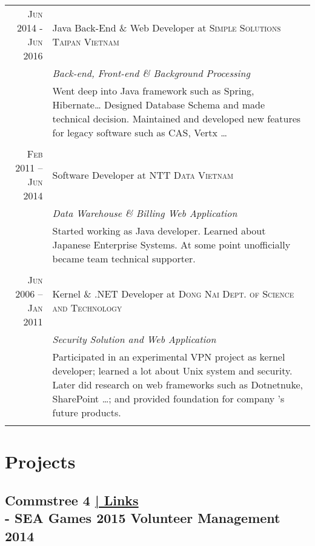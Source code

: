 \documentclass[a4paper,10pt]{article}
\begin{document}
\begin{tabular}{r|p{11cm}}

  \textsc{Jun 2014 - Jun 2016} & Java Back-End \& Web Developer at \textsc{Simple Solutions Taipan Vietnam} \\
  &\emph{Back-end, Front-end \& Background Processing}\\
  &\footnotesize{
    Went deep into Java framework such as Spring, Hibernate\ldots
    Designed Database Schema and made technical decision.
    Maintained and developed new features for legacy software such as CAS, Vertx \ldots}\\
  \multicolumn{2}{c}{} \\

  \textsc{Feb 2011 – Jun 2014} & Software Developer at \textsc{NTT Data Vietnam} \\
  &\emph{Data Warehouse \& Billing Web Application}\\
  &\footnotesize{Started working as Java developer.
    Learned about Japanese Enterprise Systems.
    At some point unofficially became team technical supporter.}\\
  \multicolumn{2}{c}{} \\

  \textsc{Jun 2006 – Jan 2011} & Kernel \& .NET Developer at \textsc{Dong Nai Dept. of Science and Technology} \\
  &\emph{Security Solution and Web Application}\\
  &\footnotesize{Participated in an experimental VPN project as kernel developer;
    learned a lot about Unix system and security.
    Later did research on web frameworks such as Dotnetnuke, SharePoint \ldots;
    and provided foundation for company 's future products.}\\
  \multicolumn{2}{c}{} \\

\end{tabular}

\section{Projects}

\subsection*{Commstree 4 \hfill \footnotesize {\hyperlink{ct-links}{| Links}}\\\large - SEA Games 2015 Volunteer Management\\\small 2014}
\end{document}
